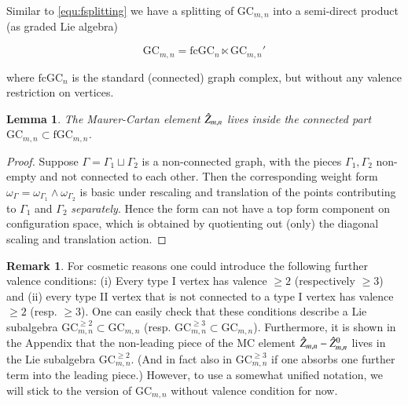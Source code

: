 \documentclass[a4paper]{amsart}
\theoremstyle{plain}
\newtheorem{lemma}[thm]{Lemma}
\theoremstyle{definition}
\newtheorem{rem}[thm]{Remark}
\newcommand{\fGCc}{{\mathrm{fcGC}}}
\newcommand{\GC}{\mathrm{GC}}
\newcommand{\fGC}{\mathrm{fGC}}
\newcommand{\beq}[1]{
\begin{equation}\label{#1}
}
\newcommand{\eeq}{
\end{equation}
}
\begin{document}
Similar to \eqref{equ:fsplitting} we have a splitting of $\GC_{m,n}$ into a semi-direct product (as graded Lie algebra) 
\beq{equ:splitting}
\GC_{m,n} = \fGCc_n \ltimes \GC_{m,n}'
\eeq
where $\fGCc_n$ is the standard (connected) graph complex, but without any valence restriction on vertices.

\begin{lemma}
The Maurer-Cartan element $\hat Z_{m,n}$ lives inside the connected part $\GC_{m,n}\subset \fGC_{m,n}$.
\end{lemma}
\begin{proof}
Suppose $\Gamma=\Gamma_1\sqcup \Gamma_2$ is a non-connected graph, with the pieces $\Gamma_1,\Gamma_2$ non-empty and not connected to each other. Then the corresponding weight form $\omega_\Gamma=\omega_{\Gamma_1}\wedge \omega_{\Gamma_2}$ is 
basic under rescaling and translation of the points contributing to $\Gamma_1$ and $\Gamma_2$ \emph{separately}. 
Hence the form can not have a top form component on configuration space, which is obtained by quotienting out (only) the diagonal scaling and translation action. 
\end{proof}

\begin{rem}
For cosmetic reasons one could introduce the following further valence conditions:
(i) Every type I vertex has valence $\geq 2$ (respectively $\geq 3$) and (ii) every type II vertex that is not connected to a type I vertex has valence $\geq 2$ (resp. $\geq 3$).
One can easily check that these conditions describe a Lie subalgebra $\GC_{m,n}^{\geq 2}\subset \GC_{m,n}$ (resp. $\GC_{m,n}^{\geq 3}\subset \GC_{m,n}$).
Furthermore, it is shown in the Appendix that the non-leading piece of the MC element $\hat Z_{m,n}-\hat Z_{m,n}^0$ lives in the Lie subalgebra $\GC_{m,n}^{\geq 2}$.
(And in fact also in $\GC_{m,n}^{\geq 3}$ if one absorbs one further term into the leading piece.)
However, to use a somewhat unified notation, we will stick to the version of $\GC_{m,n}$ without valence condition for now.
\end{rem}
\end{document}

